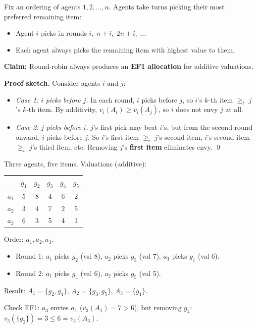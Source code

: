 \begin{thmbox}
Fix an ordering of agents $1, 2, \ldots, n$. Agents take turns picking their most preferred remaining item:
\begin{itemize}
  \item Agent $i$ picks in rounds $i,\; n + i,\; 2n + i,\; \ldots$
  \item Each agent always picks the remaining item with highest value to them.
\end{itemize}
\textbf{Claim:} Round-robin always produces an \textbf{EF1 allocation} for additive valuations.
\end{thmbox}

\textbf{Proof sketch.} Consider agents $i$ and $j$:
\begin{itemize}
  \item \emph{Case 1: $i$ picks before $j$.} In each round, $i$ picks before $j$, so $i$'s $k$-th item $\geq_i$ $j$'s $k$-th item. By additivity, $v_i(A_i) \geq v_i(A_j)$, so $i$ does not envy $j$ at all.
  \item \emph{Case 2: $j$ picks before $i$.} $j$'s first pick may beat $i$'s, but from the second round onward, $i$ picks before $j$. So $i$'s first item $\geq_i$ $j$'s second item, $i$'s second item $\geq_i$ $j$'s third item, etc. Removing $j$'s \textbf{first item} eliminates envy. \qed
\end{itemize}

\begin{exbox}
Three agents, five items. Valuations (additive):

\begin{center}
\begin{tabular}{lccccc}
\toprule
       & $g_1$ & $g_2$ & $g_3$ & $g_4$ & $g_5$ \\
\midrule
$a_1$  & 5     & 8     & 4     & 6     & 2 \\
$a_2$  & 3     & 4     & 7     & 2     & 5 \\
$a_3$  & 6     & 3     & 5     & 4     & 1 \\
\bottomrule
\end{tabular}
\end{center}

Order: $a_1, a_2, a_3$.
\begin{itemize}
  \item Round 1: $a_1$ picks $g_2$ (val 8), $a_2$ picks $g_3$ (val 7), $a_3$ picks $g_1$ (val 6).
  \item Round 2: $a_1$ picks $g_4$ (val 6), $a_2$ picks $g_5$ (val 5).
\end{itemize}
Result: $A_1 = \{g_2, g_4\}$, $A_2 = \{g_3, g_5\}$, $A_3 = \{g_1\}$.

Check EF1: $a_3$ envies $a_1$ ($v_3(A_1) = 7 > 6$), but removing $g_4$: $v_3(\{g_2\}) = 3 \leq 6 = v_3(A_3)$. \checkmark
\end{exbox}

